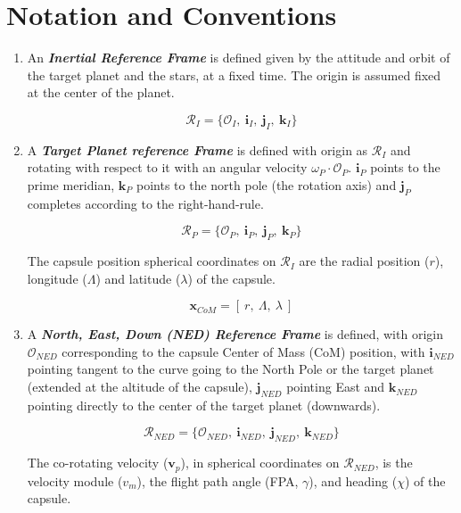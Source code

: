 \newpage
\chapter{Notation and Conventions}

   \begin{enumerate}
      \item An \textbf{\textit{Inertial Reference Frame}} is defined given by the attitude and orbit of the target planet
         and the stars, at a fixed time.
         The origin is assumed fixed at the center of the planet.

         $$\mathcal{R}_{I}=\{ \mathcal{O}_{I},\: \textbf{i}_{I},\:\textbf{j}_I,\: \textbf{k}_I \}$$

      \item A \textbf{\textit{Target Planet reference Frame}} is defined with 
         origin as $\mathcal{R}_{I}$ and rotating with respect to it with an angular
         velocity $\omega_{P}\cdot \mathcal{O}_{P}$.
         $\textbf{i}_{P}$ points to the prime meridian, $\textbf{k}_{P}$ points to the
         north pole (the rotation axis) and $\textbf{j}_{P}$ completes according
         to the right-hand-rule.

         $$\mathcal{R}_{P}=\{ \mathcal{O}_{P},\: \textbf{i}_{P},\:\textbf{j}_P,\: \textbf{k}_P \}$$

         The capsule position spherical coordinates on $\mathcal{R}_{I}$ are the radial position
         ($r$), longitude ($\Lambda$) and latitude ($\lambda$) of the capsule.
      
         $$
            \textbf{x}_{CoM} = [\: r,\:\Lambda,\:\lambda \:]
         $$

      \item A \textbf{\textit{North, East, Down (NED) Reference Frame}} is defined, with origin $\mathcal{O}_{NED}$
         corresponding to the capsule Center of Mass (CoM) position, with $\textbf{i}_{NED}$
         pointing tangent to the curve going to the North Pole or the target planet (extended at
         the altitude of the capsule), $\textbf{j}_{NED}$ pointing East and $\textbf{k}_{NED}$
         pointing directly to the center of the target planet (downwards).

         $$\mathcal{R}_{NED}=\{ \mathcal{O}_{NED},\: \textbf{i}_{NED},\:\textbf{j}_{NED},\: \textbf{k}_{NED} \}$$

         The co-rotating velocity ($\textbf{v}_{p}$), in spherical coordinates on $\mathcal{R}_{NED}$, is the velocity module ($v_{m}$), 
         the flight path angle (FPA, $\gamma$), and heading ($\chi$) of the capsule.
      

\end{enumerate}
